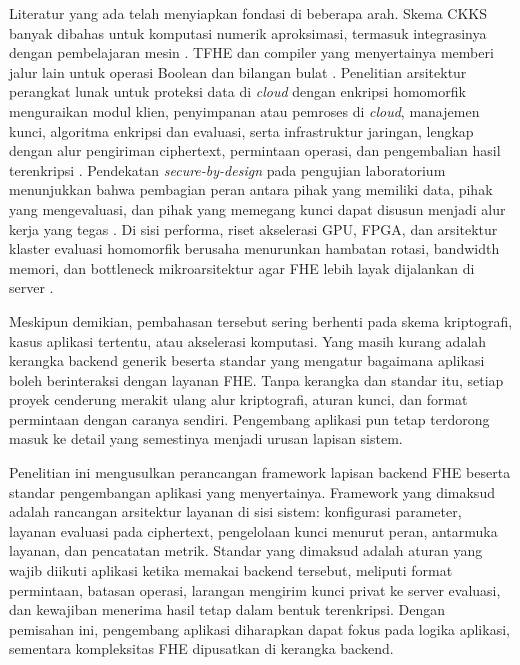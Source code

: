 \documentclass[12pt,a4paper,oneside]{report}
\begin{document}
Literatur yang ada telah menyiapkan fondasi di beberapa arah. Skema CKKS banyak dibahas untuk komputasi numerik aproksimasi, termasuk integrasinya dengan pembelajaran mesin \cite{wu2025ckksSurvey}. TFHE dan compiler yang menyertainya memberi jalur lain untuk operasi Boolean dan bilangan bulat \cite{peker2025confidentialStatisticalFhe}. Penelitian arsitektur perangkat lunak untuk proteksi data di \emph{cloud} dengan enkripsi homomorfik menguraikan modul klien, penyimpanan atau pemroses di \emph{cloud}, manajemen kunci, algoritma enkripsi dan evaluasi, serta infrastruktur jaringan, lengkap dengan alur pengiriman ciphertext, permintaan operasi, dan pengembalian hasil terenkripsi \cite{epishkina2025cloudHeArchitecture}. Pendekatan \emph{secure-by-design} pada pengujian laboratorium menunjukkan bahwa pembagian peran antara pihak yang memiliki data, pihak yang mengevaluasi, dan pihak yang memegang kunci dapat disusun menjadi alur kerja yang tegas \cite{vinko2026secureByDesign}. Di sisi performa, riset akselerasi GPU, FPGA, dan arsitektur klaster evaluasi homomorfik berusaha menurunkan hambatan rotasi, bandwidth memori, dan bottleneck mikroarsitektur agar FHE lebih layak dijalankan di server \cite{fan2026gpuFhe,xu2026heraFpga,lee2025clusterFhe}.

Meskipun demikian, pembahasan tersebut sering berhenti pada skema kriptografi, kasus aplikasi tertentu, atau akselerasi komputasi. Yang masih kurang adalah kerangka backend generik beserta standar yang mengatur bagaimana aplikasi boleh berinteraksi dengan layanan FHE. Tanpa kerangka dan standar itu, setiap proyek cenderung merakit ulang alur kriptografi, aturan kunci, dan format permintaan dengan caranya sendiri. Pengembang aplikasi pun tetap terdorong masuk ke detail yang semestinya menjadi urusan lapisan sistem.

Penelitian ini mengusulkan perancangan framework lapisan backend FHE beserta standar pengembangan aplikasi yang menyertainya. Framework yang dimaksud adalah rancangan arsitektur layanan di sisi sistem: konfigurasi parameter, layanan evaluasi pada ciphertext, pengelolaan kunci menurut peran, antarmuka layanan, dan pencatatan metrik. Standar yang dimaksud adalah aturan yang wajib diikuti aplikasi ketika memakai backend tersebut, meliputi format permintaan, batasan operasi, larangan mengirim kunci privat ke server evaluasi, dan kewajiban menerima hasil tetap dalam bentuk terenkripsi. Dengan pemisahan ini, pengembang aplikasi diharapkan dapat fokus pada logika aplikasi, sementara kompleksitas FHE dipusatkan di kerangka backend.
\end{document}
